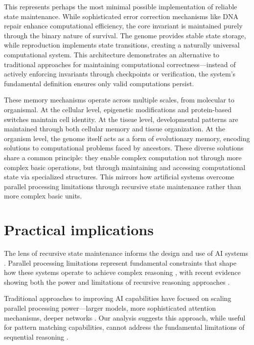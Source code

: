 \documentclass[12pt]{article}
\begin{document}
This represents perhaps the most minimal possible implementation of reliable state maintenance.
While sophisticated error correction mechanisms like DNA repair enhance computational efficiency, the core invariant is maintained purely through the binary nature of survival.
The genome provides stable state storage, while reproduction implements state transitions, creating a naturally universal computational system.
This architecture demonstrates an alternative to traditional approaches for maintaining computational correctness---instead of actively enforcing invariants through checkpoints or verification, the system's fundamental definition ensures only valid computations persist.

These memory mechanisms operate across multiple scales, from molecular to organismal.
At the cellular level, epigenetic modifications and protein-based switches maintain cell identity.
At the tissue level, developmental patterns are maintained through both cellular memory and tissue organization.
At the organism level, the genome itself acts as a form of evolutionary memory, encoding solutions to computational problems faced by ancestors.
These diverse solutions share a common principle: they enable complex computation not through more complex basic operations, but through maintaining and accessing computational state via specialized structures.
This mirrors how artificial systems overcome parallel processing limitations through recursive state maintenance rather than more complex basic units.

\section{Practical implications}

The lens of recursive state maintenance informs the design and use of AI systems \cite{dickson2024trust,ahn2024recursive,openai2024o1}.
Parallel processing limitations represent fundamental constraints that shape how these systems operate to achieve complex reasoning \cite{merrill2023parallelism}, with recent evidence showing both the power and limitations of recursive reasoning approaches \cite{liu2024mind}.

Traditional approaches to improving AI capabilities have focused on scaling parallel processing power---larger models, more sophisticated attention mechanisms, deeper networks \cite{shallue2019measuring}.
Our analysis suggests this approach, while useful for pattern matching capabilities, cannot address the fundamental limitations of sequential reasoning \cite{peng2024limitations}.
\end{document}
